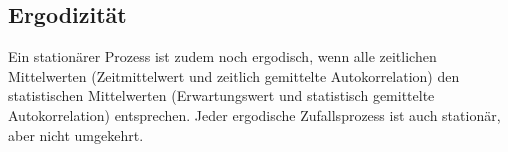 \subsection{Ergodizität}
Ein stationärer Prozess ist zudem noch ergodisch, wenn alle zeitlichen Mittelwerten (Zeitmittelwert und zeitlich gemittelte Autokorrelation) den statistischen Mittelwerten (Erwartungswert und statistisch gemittelte Autokorrelation) entsprechen. Jeder ergodische Zufallsprozess ist auch stationär, aber nicht umgekehrt.
